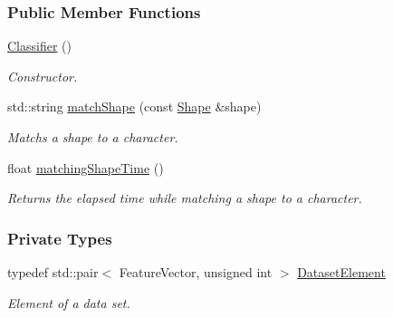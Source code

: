 \subsubsection*{Public Member Functions}
\begin{CompactItemize}
\item 
\hyperlink{class_classifier_e6132b100c96a4f3d8ad3885b5acb28e}{Classifier} ()
\begin{CompactList}\small\item\em Constructor. \item\end{CompactList}\item 
std::string \hyperlink{class_classifier_6fd6a8332d3188ac605ff452ab6dc9c2}{matchShape} (const \hyperlink{class_shape}{Shape} \&shape)
\begin{CompactList}\small\item\em Matchs a shape to a character. \item\end{CompactList}\item 
float \hyperlink{class_classifier_82e313296065218b1a01b5e44daa4c2f}{matchingShapeTime} ()
\begin{CompactList}\small\item\em Returns the elapsed time while matching a shape to a character. \item\end{CompactList}\end{CompactItemize}
\subsubsection*{Private Types}
\begin{CompactItemize}
\item 
typedef std::pair$<$ FeatureVector, unsigned int $>$ \hyperlink{class_classifier_3487f0cd88135d7782cf4a460e221e9e}{DatasetElement}
\begin{CompactList}\small\item\em Element of a data set. \item\end{CompactList}\end{CompactItemize}
